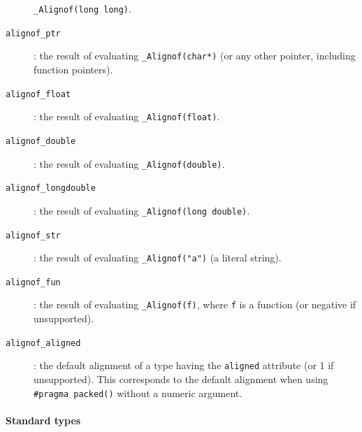\begin{description}
    \verb+_Alignof(long long)+.
  \item[\texttt{alignof\_ptr}]: the result of evaluating \verb+_Alignof(char*)+
    (or any other pointer, including function pointers).
  \item[\texttt{alignof\_float}]: the result of evaluating
    \verb+_Alignof(float)+.
  \item[\texttt{alignof\_double}]: the result of evaluating
    \verb+_Alignof(double)+.
  \item[\texttt{alignof\_longdouble}]: the result of evaluating
    \verb+_Alignof(long double)+.
  \item[\texttt{alignof\_str}]: the result of evaluating \verb+_Alignof("a")+
    (a literal string).
  \item[\texttt{alignof\_fun}]: the result of evaluating \verb+_Alignof(f)+,
    where \verb+f+ is a function (or negative if unsupported).
  \item[\texttt{alignof\_aligned}]: the default alignment of a type having the
    \verb+aligned+ attribute (or 1 if unsupported). This corresponds to the
    default alignment when using \verb+#pragma packed()+ without a numeric
    argument.
\end{description}

\paragraph{Standard types}

